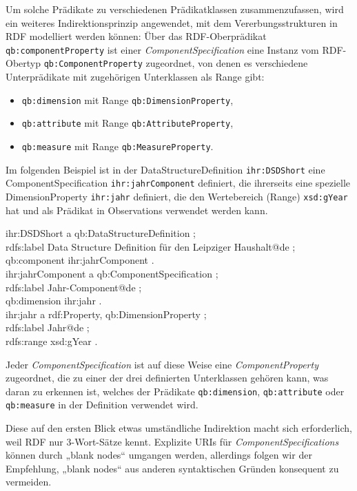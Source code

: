 \documentclass[a4paper,11pt,twoside]{article}
\begin{document}
Um solche Prädikate zu verschiedenen Prädikatklassen zusammenzufassen, wird ein
weiteres Indirektionsprinzip angewendet, mit dem Vererbungsstrukturen in RDF
modelliert werden können: Über das RDF-Oberprädikat
\texttt{qb:componentProperty} ist einer \emph{ComponentSpecification} eine
Instanz vom RDF-Obertyp \texttt{qb:ComponentProperty} zugeordnet, von denen es
verschiedene Unterprädikate mit zugehörigen Unterklassen als Range gibt:
\begin{itemize}\itemsep0pt
\item \texttt{qb:dimension} mit Range \texttt{qb:DimensionProperty},
\item \texttt{qb:attribute} mit Range \texttt{qb:AttributeProperty},
\item \texttt{qb:measure} mit Range \texttt{qb:MeasureProperty}.
\end{itemize}
Im folgenden Beispiel ist in der DataStructureDefinition \texttt{ihr:DSDShort}
eine ComponentSpecification \texttt{ihr:jahrComponent} definiert, die
ihrerseits eine spezielle DimensionProperty \texttt{ihr:jahr} definiert, die
den Wertebereich (Range) \texttt{xsd:gYear} hat und als Prädikat in
Observations verwendet werden kann.
\begin{code}
ihr:DSDShort a qb:DataStructureDefinition ;\+\\
  rdfs:label {\dq}Data Structure Definition für den Leipziger Haushalt{\dq}@de ;\\
  qb:component ihr:jahrComponent .\-\\[6pt]
ihr:jahrComponent a qb:ComponentSpecification ;\+\\
  rdfs:label {\dq}Jahr-Component{\dq}@de ;\\
  qb:dimension ihr:jahr .\-\\[6pt]
ihr:jahr a rdf:Property, qb:DimensionProperty ;\+\\
  rdfs:label {\dq}Jahr{\dq}@de ;\\
  rdfs:range xsd:gYear .
\end{code}
Jeder \emph{ComponentSpecification} ist auf diese Weise eine
\emph{ComponentProperty} zugeordnet, die zu einer der drei definierten
Unterklassen gehören kann, was daran zu erkennen ist, welches der Prädikate
\texttt{qb:dimension}, \texttt{qb:attribute} oder \texttt{qb:measure} in der
Definition verwendet wird.  

Diese auf den ersten Blick etwas umständliche Indirektion macht sich
erforderlich, weil RDF nur 3-Wort-Sätze kennt.  Explizite URIs für
\emph{ComponentSpecifications} können durch „blank nodes“ umgangen werden,
allerdings folgen wir der Empfehlung, „blank nodes“ aus anderen syntaktischen
Gründen konsequent zu vermeiden.  
\end{document}

